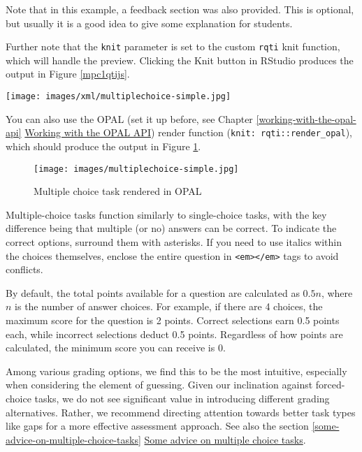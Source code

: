 \documentclass[twoside]{tufte-book}
\begin{document}
Note that in this example, a feedback section was also provided. This is optional, but usually it is a good idea to give some explanation for students.

Further note that the \texttt{knit} parameter is set to the custom \texttt{rqti} knit function, which will handle the preview. Clicking the Knit button in RStudio produces the output in Figure \ref{mpc1qtijs}.

\begin{figure*}
\centering
\texttt{[image: images/xml/multiplechoice-simple.jpg]}
\caption{\label{mpc1qtijs}Multiple choice task rendered in qtijs}
\end{figure*}

You can also use the OPAL (set it up before, see Chapter \ref{working-with-the-opal-api} \href{api_opal.html}{Working with the OPAL API}) render function (\texttt{knit:\ rqti::render\_opal}), which should produce the output in Figure \ref{mpc1opal}.

\begin{figure}
\centering
\texttt{[image: images/multiplechoice-simple.jpg]}
\caption{\label{mpc1opal}Multiple choice task rendered in OPAL}
\end{figure}

Multiple-choice tasks function similarly to single-choice tasks, with the key difference being that multiple (or no) answers can be correct. To indicate the correct options, surround them with asterisks. If you need to use italics within the choices themselves, enclose the entire question in \texttt{\textless{}em\textgreater{}\textless{}/em\textgreater{}} tags to avoid conflicts.

By default, the total points available for a question are calculated as \(0.5n\), where \(n\) is the number of answer choices. For example, if there are 4 choices, the maximum score for the question is 2 points. Correct selections earn 0.5 points each, while incorrect selections deduct 0.5 points. Regardless of how points are calculated, the minimum score you can receive is 0.

Among various grading options, we find this to be the most intuitive, especially when considering the element of guessing. Given our inclination against forced-choice tasks, we do not see significant value in introducing different grading alternatives. Rather, we recommend directing attention towards better task types like gaps for a more effective assessment approach. See also the section \ref{some-advice-on-multiple-choice-tasks} \hyperref[some-advice-on-multiple-choice-tasks]{Some advice on multiple choice tasks}.
\end{document}
